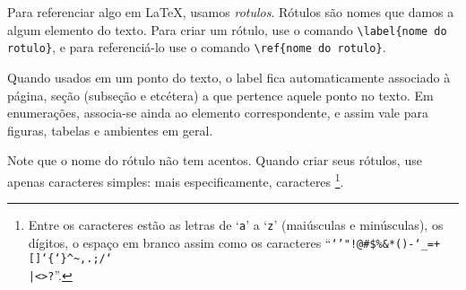 Para referenciar algo em \LaTeX, usamos \emph{rotulos}. Rótulos são nomes que damos a algum elemento do texto. Para criar um rótulo, use o comando \verb'\label{nome do rotulo}', e para referenciá-lo use o comando \verb'\ref{nome do rotulo}'. 

Quando usados em um ponto do texto, o label fica automaticamente associado à página, seção (subseção e etcétera) a que pertence aquele ponto no texto. Em enumerações, associa-se ainda ao elemento correspondente, e assim vale para figuras, tabelas e ambientes em geral.

Note que o nome do rótulo não tem acentos. Quando criar seus rótulos, use apenas caracteres simples: mais especificamente, caracteres  \footnote{Entre os caracteres  estão as letras de `\texttt{a}' a `\texttt{z}' (maiúsculas e minúsculas), os dígitos, o espaço em branco assim como os caracteres ``\texttt{`'"!@\#\$\%\&*()-\char`\_=+[]\char`\{\char`\}\^{}\~{},.;/\char`\\|<>?}''.}.

